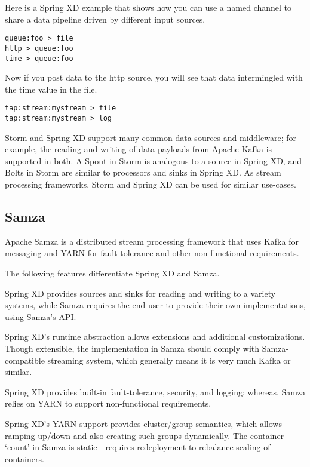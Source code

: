 Here is a Spring XD example that shows how you can use a named channel to share
a data pipeline driven by different input sources.

\begin{lstlisting}
queue:foo > file
http > queue:foo
time > queue:foo
\end{lstlisting}

Now if you post data to the http source, you will see that data intermingled
with the time value in the file.

\begin{lstlisting}
tap:stream:mystream > file
tap:stream:mystream > log
\end{lstlisting}

Storm and Spring XD support many common data sources and middleware;
for example, the reading and writing of data payloads from Apache Kafka
is supported in both. A Spout in Storm is analogous to a
source in Spring XD, and Bolts in Storm are similar to processors and sinks
in Spring XD. As stream processing frameworks, Storm and Spring XD can be used for
similar use-cases.

\subsection{Samza}
Apache Samza\cite{samza} is a distributed stream processing framework that uses
Kafka for messaging and YARN for fault-tolerance and other non-functional
requirements.

The following features differentiate Spring XD and Samza.

\begin{itemize*}
\item Spring XD provides sources and sinks for reading and writing to a 
variety systems, while Samza requires the end user to provide their
own implementations, using Samza's API.
\item Spring XD's runtime abstraction allows extensions and additional
customizations. Though extensible, the implementation in Samza should comply with
Samza-compatible streaming system, which generally means it is very much Kafka
or similar.
\item Spring XD provides built-in fault-tolerance, security, and logging; whereas,
Samza relies on YARN to support non-functional requirements.
\item Spring XD's YARN support provides cluster/group semantics, which allows
ramping up/down and also creating such groups dynamically. The container `count'
in Samza is static - requires redeployment to rebalance scaling of containers.
\end{itemize*}


